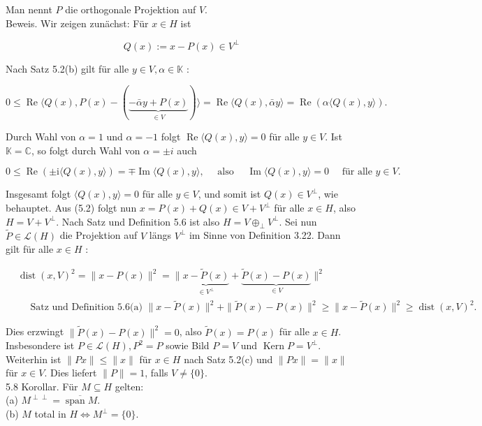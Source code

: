 \documentclass[10pt, letterpaper]{article}
\begin{document}
Man nennt $P$ die orthogonale Projektion auf $V$.\\
Beweis. Wir zeigen zunächst: Für $x \in H$ ist

$$
Q(x):=x-P(x) \in V^{\perp}
$$

Nach Satz 5.2(b) gilt für alle $y \in V, \alpha \in \mathbb{K}$ :

$$
0 \leq \operatorname{Re}\langle Q(x), P(x)-(\underbrace{-\bar{\alpha} y+P(x)}_{\in V})\rangle=\operatorname{Re}\langle Q(x), \bar{\alpha} y\rangle=\operatorname{Re}(\alpha\langle Q(x), y\rangle) .
$$

Durch Wahl von $\alpha=1$ und $\alpha=-1$ folgt $\operatorname{Re}\langle Q(x), y\rangle=0$ für alle $y \in V$. Ist $\mathbb{K}=\mathbb{C}$, so folgt durch Wahl von $\alpha= \pm i$ auch

$$
0 \leq \operatorname{Re}( \pm \mathrm{i}\langle Q(x), y\rangle)=\mp \operatorname{Im}\langle Q(x), y\rangle, \quad \text { also } \quad \operatorname{Im}\langle Q(x), y\rangle=0 \quad \text { für alle } y \in V .
$$

Insgesamt folgt $\langle Q(x), y\rangle=0$ für alle $y \in V$, und somit ist $Q(x) \in V^{\perp}$, wie behauptet. Aus (5.2) folgt nun $x=P(x)+Q(x) \in V+V^{\perp}$ für alle $x \in H$, also $H=V+V^{\perp}$. Nach Satz und Definition 5.6 ist also $H=V \oplus_{\perp} V^{\perp}$. Sei nun $\widetilde{P} \in \mathcal{L}(H)$ die Projektion auf $V$ längs $V^{\perp}$ im Sinne von Definition 3.22. Dann gilt für alle $x \in H$ :

$$
\begin{aligned}
& \operatorname{dist}(x, V)^{2}=\|x-P(x)\|^{2}=\|\underbrace{x-\widetilde{P}(x)}_{\in V^{\perp}}+\underbrace{\widetilde{P}(x)-P(x)}_{\in V}\|^{2} \\
& \quad \text { Satz und Definition 5.6(a) }\|x-\widetilde{P}(x)\|^{2}+\|\widetilde{P}(x)-P(x)\|^{2} \geq\|x-\widetilde{P}(x)\|^{2} \geq \operatorname{dist}(x, V)^{2} .
\end{aligned}
$$

Dies erzwingt $\|\widetilde{P}(x)-P(x)\|^{2}=0$, also $\widetilde{P}(x)=P(x)$ für alle $x \in H$. Insbesondere ist $P \in \mathcal{L}(H), P^{2}=P$ sowie Bild $P=V$ und $\operatorname{Kern} P=V^{\perp}$. Weiterhin ist $\|P x\| \leq\|x\|$ für $x \in H$ nach Satz 5.2(c) und $\|P x\|=\|x\|$ für $x \in V$. Dies liefert $\|P\|=1$, falls $V \neq\{0\}$.\\
5.8 Korollar. Für $M \subseteq H$ gelten:\\
(a) $M^{\perp \perp}=\overline{\operatorname{span} M}$.\\
(b) $M$ total in $H \Longleftrightarrow M^{\perp}=\{0\}$.
\end{document}
